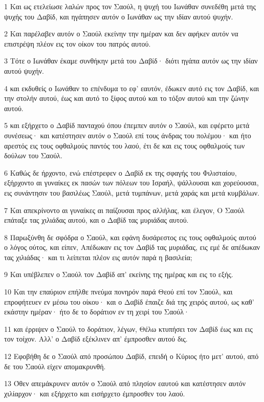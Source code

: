 \par 1 Και ως ετελείωσε λαλών προς τον Σαούλ, η ψυχή του Ιωνάθαν συνεδέθη μετά της ψυχής του Δαβίδ, και ηγάπησεν αυτόν ο Ιωνάθαν ως την ιδίαν αυτού ψυχήν.
\par 2 Και παρέλαβεν αυτόν ο Σαούλ εκείνην την ημέραν και δεν αφήκεν αυτόν να επιστρέψη πλέον εις τον οίκον του πατρός αυτού.
\par 3 Τότε ο Ιωνάθαν έκαμε συνθήκην μετά του Δαβίδ· διότι ηγάπα αυτόν ως την ιδίαν αυτού ψυχήν.
\par 4 και εκδυθείς ο Ιωνάθαν το επένδυμα το εφ' εαυτόν, έδωκεν αυτό εις τον Δαβίδ, και την στολήν αυτού, έως και αυτό το ξίφος αυτού και το τόξον αυτού και την ζώνην αυτού.
\par 5 και εξήρχετο ο Δαβίδ πανταχού όπου έπεμπεν αυτόν ο Σαούλ, και εφέρετο μετά συνέσεως· και κατέστησεν αυτόν ο Σαούλ επί τους άνδρας του πολέμου· και ήτο αρεστός εις τους οφθαλμούς παντός του λαού, έτι δε και εις τους οφθαλμούς των δούλων του Σαούλ.
\par 6 Καθώς δε ήρχοντο, ενώ επέστρεφεν ο Δαβίδ εκ της σφαγής του Φιλισταίου, εξήρχοντο αι γυναίκες εκ πασών των πόλεων του Ισραήλ, ψάλλουσαι και χορεύουσαι, εις συνάντησιν του βασιλέως Σαούλ, μετά τυμπάνων, μετά χαράς και μετά κυμβάλων.
\par 7 Και απεκρίνοντο αι γυναίκες αι παίζουσαι προς αλλήλας, και έλεγον, Ο Σαούλ επάταξε τας χιλιάδας αυτού, και ο Δαβίδ τας μυριάδας αυτού.
\par 8 Παρωξύνθη δε σφόδρα ο Σαούλ, και εφάνη δυσάρεστος εις τους οφθαλμούς αυτού ο λόγος ούτος, και είπεν, Απέδωκαν εις τον Δαβίδ τας μυριάδας, εις εμέ δε απέδωκαν τας χιλιάδας· και τι λείπεται πλέον εις αυτόν παρά η βασιλεία;
\par 9 Και υπέβλεπεν ο Σαούλ τον Δαβίδ απ' εκείνης της ημέρας και εις το εξής.
\par 10 Και την επαύριον επήλθε πνεύμα πονηρόν παρά Θεού επί τον Σαούλ, και επροφήτευεν εν μέσω του οίκου· και ο Δαβίδ έπαιζε διά της χειρός αυτού, ως καθ' εκάστην ημέραν· ήτο δε το δοράτιον εν τη χειρί του Σαούλ·
\par 11 και έρριψεν ο Σαούλ το δοράτιον, λέγων, Θέλω κτυπήσει τον Δαβίδ έως και εις τον τοίχον. Αλλ' ο Δαβίδ εξέκλινεν απ' έμπροσθεν αυτού δις.
\par 12 Εφοβήθη δε ο Σαούλ από προσώπου Δαβίδ, επειδή ο Κύριος ήτο μετ' αυτού, από δε του Σαούλ είχεν απομακρυνθή.
\par 13 Όθεν απεμάκρυνεν αυτόν ο Σαούλ από πλησίον εαυτού και κατέστησεν αυτόν χιλίαρχον· και εξήρχετο και εισήρχετο έμπροσθεν του λαού.
